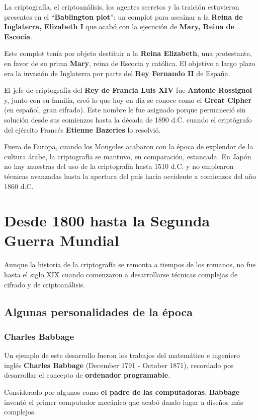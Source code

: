 \documentclass[nochap]{apuntesURJC}
\begin{document}
La criptografía, el criptoanálisis, los agentes secretos y la traición estuvieron presentes en el ``\textbf{Bablington plot}'': un complot para asesinar a la \textbf{Reina de Inglaterra, Elizabeth I} que acabó con la ejecución de \textbf{Mary, Reina de Escocia}.

Este complot tenía por objeto destituir a la \textbf{Reina Elizabeth}, una protestante, en favor de su prima \textbf{Mary}, reina de Escocia y católica. El objetivo a largo plazo era la invasión de Inglaterra por parte del \textbf{Rey Fernando II} de España.

El jefe de criptografía del \textbf{Rey de Francia Luis XIV} fue \textbf{Antonie Rossignol} y, junto con su familia, creó lo que hoy en día se conoce como el \textbf{Great Cipher} (en español, gran cifrado). Este nombre le fue asignado porque permaneció sin solución desde sus comienzos hasta la década de 1890 d.C. cuando el criptógrafo del ejército Francés \textbf{Etienne Bazeries} lo resolvió.

Fuera de Europa, cuando los Mongoles acabaron con la época de explendor de la cultura árabe, la criptografía se mantuvo, en comparación, estancada. En Japón no hay muestras del uso de la criptografía hasta 1510 d.C. y no emplearon técnicas avanzadas hasta la apertura del país hacia occidente a comienzos del año 1860 d.C.

\section{Desde 1800 hasta la Segunda Guerra Mundial}
Aunque la historia de la criptografía se remonta a tiempos de los romanos, no fue hasta el siglo XIX cuando comenzaron a desarrollarse técnicas complejas de cifrado y de criptoanálisis.

\subsection{Algunas personalidades de la época}
\subsubsection{Charles Babbage}
Un ejemplo de este desarrollo fueron los trabajos del matemático e ingeniero inglés \textbf{Charles Babbage} (December 1791 - October 1871), recordado por desarrollar el concepto de \textbf{ordenador programable}.

Considerado por algunos como \textbf{el padre de las computadoras}, \textbf{Babbage} inventó el primer computador mecánico que acabó dando lugar a diseños más complejos.
\end{document}
